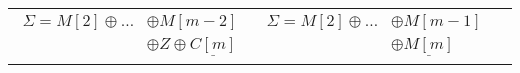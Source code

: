 \begin{tabular}{ccc}
\\

\scriptsize{ $\begin{aligned}
\Sigma = M[2] \oplus \ldots &\oplus M[m-2] \\&\oplus Z \oplus \underline{C[m]}\end{aligned}
$} & 
\scriptsize{
$\begin{aligned}
	\Sigma = M[2] \oplus \ldots &\oplus M[m-1] \\ &\oplus \underline{M[m]}
\end{aligned}
$%
}

\end{tabular}
	


